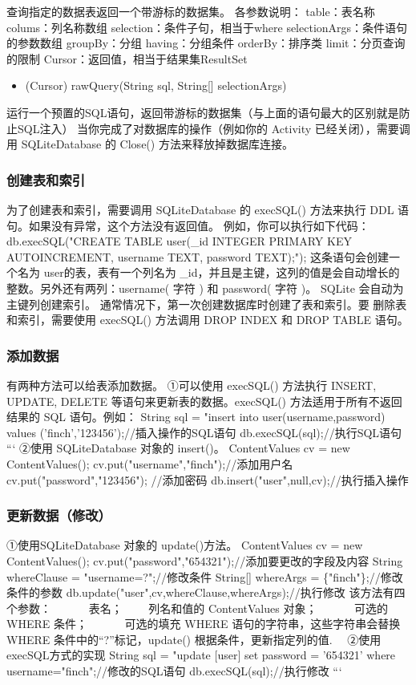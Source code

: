 \documentclass[9pt, b5paper]{article}
\begin{document}
查询指定的数据表返回一个带游标的数据集。
 各参数说明：
table：表名称
colums：列名称数组
selection：条件子句，相当于where
selectionArgs：条件语句的参数数组
groupBy：分组
having：分组条件
orderBy：排序类
limit：分页查询的限制
Cursor：返回值，相当于结果集ResultSet
\begin{itemize}
\item (Cursor) rawQuery(String sql, String[] selectionArgs)
\end{itemize}
运行一个预置的SQL语句，返回带游标的数据集（与上面的语句最大的区别就是防止SQL注入）
当你完成了对数据库的操作（例如你的 Activity 已经关闭），需要调用 SQLiteDatabase 的 Close() 方法来释放掉数据库连接。
\subsubsection{创建表和索引}
\label{sec-15-3-2}
为了创建表和索引，需要调用 SQLiteDatabase 的 execSQL() 方法来执行 DDL 语句。如果没有异常，这个方法没有返回值。
例如，你可以执行如下代码：
 db.execSQL("CREATE TABLE user(\_id INTEGER PRIMARY KEY   
        AUTOINCREMENT, username TEXT, password TEXT);");
这条语句会创建一个名为 user的表，表有一个列名为 \_id，并且是主键，这列的值是会自动增长的整数。另外还有两列：username( 字符 ) 和 password( 字符  )。 SQLite 会自动为主键列创建索引。
通常情况下，第一次创建数据库时创建了表和索引。要 删除表和索引，需要使用 execSQL() 方法调用 DROP INDEX 和 DROP TABLE 语句。
\subsubsection{添加数据　}
\label{sec-15-3-3}
有两种方法可以给表添加数据。
①可以使用 execSQL() 方法执行 INSERT, UPDATE, DELETE 等语句来更新表的数据。execSQL() 方法适用于所有不返回结果的 SQL 语句。例如：
String sql = "insert into user(username,password) values ('finch','123456');//插入操作的SQL语句
db.execSQL(sql);//执行SQL语句
``` 
②使用 SQLiteDatabase 对象的 insert()。
 ContentValues cv = new ContentValues();
cv.put("username","finch");//添加用户名
cv.put("password","123456"); //添加密码
db.insert("user",null,cv);//执行插入操作
\subsubsection{更新数据（修改）}
\label{sec-15-3-4}
①使用SQLiteDatabase 对象的  update()方法。
ContentValues cv = new ContentValues();
cv.put("password","654321");//添加要更改的字段及内容
String whereClause = "username=?";//修改条件
String[] whereArgs = \{"finch"\};//修改条件的参数
db.update("user",cv,whereClause,whereArgs);//执行修改
该方法有四个参数：　
 　　表名；
 　　列名和值的 ContentValues 对象；　
 　　可选的 WHERE 条件；　
 　　可选的填充 WHERE 语句的字符串，这些字符串会替换 WHERE 条件中的“?”标记，update() 根据条件，更新指定列的值.　
②使用execSQL方式的实现
String sql = "update [user] set password = '654321' where username="finch";//修改的SQL语句
db.execSQL(sql);//执行修改
``` 
\end{document}
